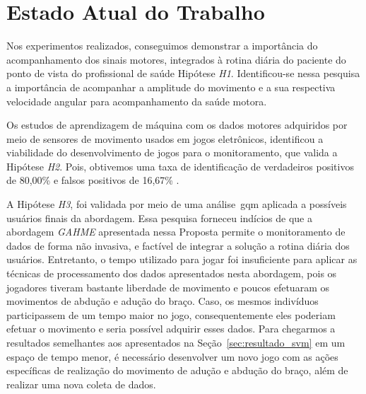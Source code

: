 \chapter{Estado Atual do Trabalho}\label{chapter:trabalhos_futuros}
Nos experimentos realizados, conseguimos demonstrar a importância do acompanhamento dos sinais motores, integrados à rotina diária do paciente do ponto de vista do profissional de saúde Hipótese \textit{H1}. Identificou-se nessa pesquisa a importância de acompanhar a amplitude do movimento e a sua respectiva velocidade angular para acompanhamento da saúde motora.

Os estudos de aprendizagem de máquina com os dados motores adquiridos por meio de sensores de movimento usados em jogos eletrônicos, identificou a viabilidade do desenvolvimento de jogos para o monitoramento, que valida a Hipótese \textit{H2}. Pois, obtivemos uma taxa de identificação de verdadeiros positivos de 80,00\% e falsos positivos de 16,67\% .

A Hipótese \textit{H3}, foi validada por meio de uma análise~\ac{gqm} aplicada a possíveis usuários finais da abordagem. Essa pesquisa forneceu indícios de que a abordagem \textit{GAHME} apresentada nessa Proposta permite o monitoramento de dados de forma não invasiva, e factível de integrar a solução a rotina diária dos usuários. Entretanto, o tempo utilizado para jogar foi insuficiente para aplicar as técnicas de processamento dos dados apresentados nesta abordagem, pois os jogadores tiveram bastante liberdade de movimento e poucos efetuaram os movimentos de abdução e adução do braço. Caso, os mesmos indivíduos participassem de um tempo maior no jogo, consequentemente eles poderiam efetuar o movimento e seria possível adquirir esses dados. Para chegarmos a resultados semelhantes aos apresentados na Seção~\ref{sec:resultado_svm} em um espaço de tempo menor, é necessário desenvolver um novo jogo com as ações específicas de realização do movimento de adução e abdução do braço, além de realizar uma nova coleta 
de dados.

